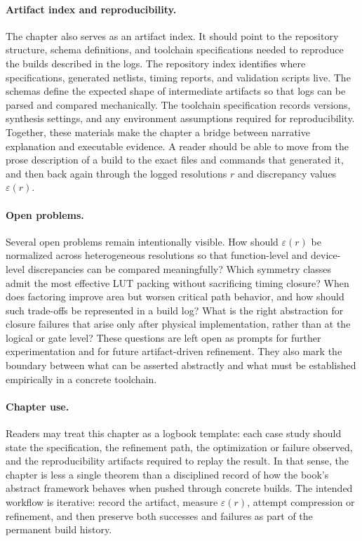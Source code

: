 \paragraph{Artifact index and reproducibility.}
The chapter also serves as an artifact index. It should point to the repository structure, schema definitions, and toolchain specifications needed to reproduce the builds described in the logs. The repository index identifies where specifications, generated netlists, timing reports, and validation scripts live. The schemas define the expected shape of intermediate artifacts so that logs can be parsed and compared mechanically. The toolchain specification records versions, synthesis settings, and any environment assumptions required for reproducibility. Together, these materials make the chapter a bridge between narrative explanation and executable evidence. A reader should be able to move from the prose description of a build to the exact files and commands that generated it, and then back again through the logged resolutions \(r\) and discrepancy values \(\varepsilon(r)\).

\paragraph{Open problems.}
Several open problems remain intentionally visible. How should \(\varepsilon(r)\) be normalized across heterogeneous resolutions so that function-level and device-level discrepancies can be compared meaningfully? Which symmetry classes admit the most effective LUT packing without sacrificing timing closure? When does factoring improve area but worsen critical path behavior, and how should such trade-offs be represented in a build log? What is the right abstraction for closure failures that arise only after physical implementation, rather than at the logical or gate level? These questions are left open as prompts for further experimentation and for future artifact-driven refinement. They also mark the boundary between what can be asserted abstractly and what must be established empirically in a concrete toolchain.

\paragraph{Chapter use.}
Readers may treat this chapter as a logbook template: each case study should state the specification, the refinement path, the optimization or failure observed, and the reproducibility artifacts required to replay the result. In that sense, the chapter is less a single theorem than a disciplined record of how the book's abstract framework behaves when pushed through concrete builds. The intended workflow is iterative: record the artifact, measure \(\varepsilon(r)\), attempt compression or refinement, and then preserve both successes and failures as part of the permanent build history.

